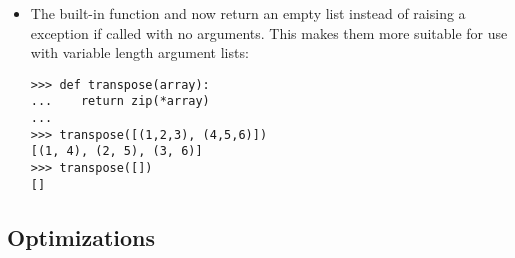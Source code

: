 \documentclass{howto}
\begin{document}
\begin{itemize}
\item The  built-in function and 
  now return an empty list instead of raising a 
  exception if called with no arguments.  This makes them more
  suitable for use with variable length argument lists:

\begin{verbatim}
>>> def transpose(array):
...    return zip(*array)
...
>>> transpose([(1,2,3), (4,5,6)])
[(1, 4), (2, 5), (3, 6)]
>>> transpose([])
[]
\end{verbatim}

\end{itemize}


\subsection{Optimizations}
\end{document}
